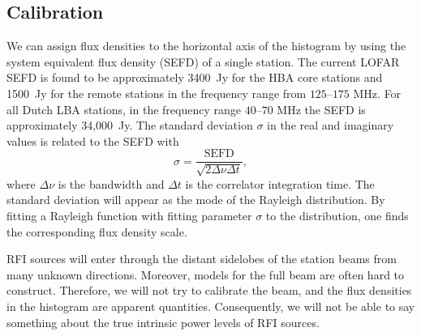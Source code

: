 \documentclass[useAMS,usenatbib]{mn2e}
\begin{document}
\subsection{Calibration} \label{sec:calibration}
We can assign flux densities to the horizontal axis of the histogram by using the system equivalent flux density (SEFD) of a single station. The current LOFAR SEFD is found to be approximately 3400~Jy for the HBA core stations and 1500~Jy for the remote stations in the frequency range from $125$--$175$ MHz. For all Dutch LBA stations, in the frequency range $40$--$70$ MHz the SEFD is approximately 34,000~Jy. The standard deviation $\sigma$ in the real and imaginary values is related to the SEFD with %
\begin{equation}
 \sigma = \frac{\textrm{SEFD}}{\sqrt{2 \Delta \nu \Delta t}},
\end{equation}
where $\Delta \nu$ is the bandwidth and $\Delta t$ is the correlator integration time. The standard deviation will appear as the mode of the Rayleigh distribution. By fitting a Rayleigh function with fitting parameter $\sigma$ to the distribution, one finds the corresponding flux density scale.

RFI sources will enter through the distant sidelobes of the station beams from many unknown directions. Moreover, models for the full beam are often hard to construct. Therefore, we will not try to calibrate the beam, and the flux densities in the histogram are apparent quantities. Consequently, we will not be able to say something about the true intrinsic power levels of RFI sources.
\end{document}
